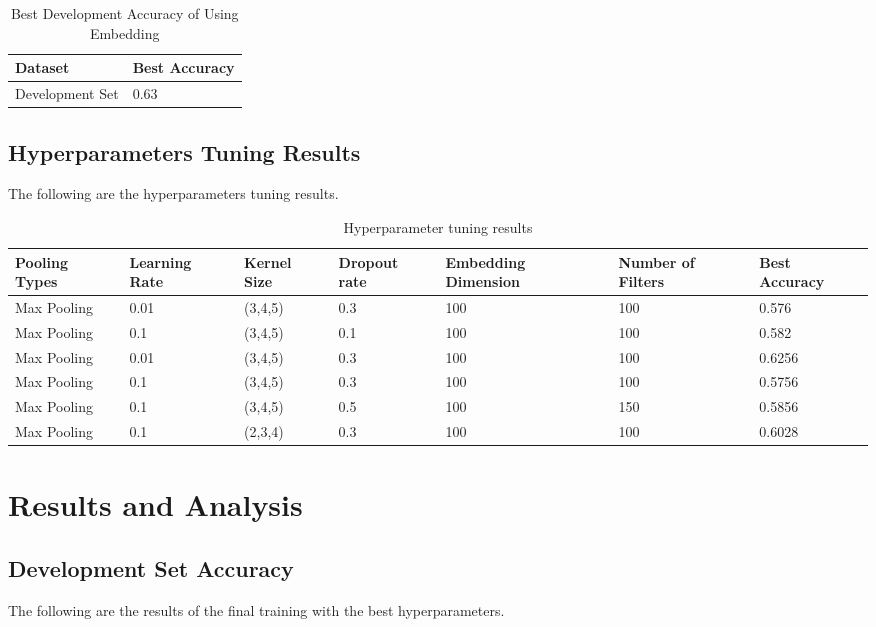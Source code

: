 \documentclass{article}
\begin{document}
\begin{table}[htb]
	\caption{Best Development Accuracy of Using Embedding}
	\label{sample-table}
	\centering
	\begin{tabular}{ll}
		\toprule
		\cmidrule{1-2}
		Dataset & Best Accuracy\\
		\midrule
		Development Set & 0.63   \\
		\bottomrule
	\end{tabular}
\end{table}

\subsection{Hyperparameters Tuning Results}
The following are the hyperparameters tuning results.

\begin{table}[htb]
	\caption{Hyperparameter tuning results}
	\label{sample-table}
	\centering
	\begin{tabular}{lllllll}
		\toprule
		\cmidrule{1-7}
		Pooling Types & Learning Rate & Kernel Size & Dropout rate & Embedding Dimension 	& Number of Filters & Best Accuracy\\
		\midrule
		Max Pooling & 0.01  & (3,4,5) & 0.3 & 100 & 100 & 0.576 \\
		Max Pooling & 0.1  & (3,4,5) & 0.1 & 100 & 100 & 0.582 \\
		Max Pooling & 0.01  & (3,4,5) & 0.3 & 100 & 100 & 0.6256 \\
		Max Pooling & 0.1  & (3,4,5) & 0.3 & 100 & 100 & 0.5756 \\
		Max Pooling & 0.1  & (3,4,5) & 0.5 & 100 & 150 & 0.5856 \\
		Max Pooling & 0.1  & (2,3,4) & 0.3 & 100 & 100 & 0.6028 \\
		\bottomrule
	\end{tabular}
\end{table}

\pagebreak

\section{Results and Analysis}

\subsection{Development Set Accuracy}
The following are the results of the final training with the best hyperparameters.
\end{document}
